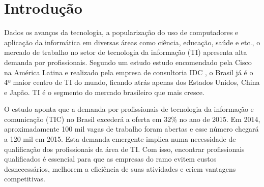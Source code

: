 
\begin{center}

\end{center}
\chapter{Introdução}

\label{chap:introduction}

Dados os avanços da tecnologia, a popularização do uso de computadores e aplicação da informática em diversas áreas como ciência, educação, saúde e etc., o mercado de trabalho no setor de tecnologia da informação (TI) apresenta alta demanda por profissionais. Segundo um estudo estudo encomendado pela Cisco na América Latina e realizado pela empresa de consultoria IDC \cite{cisco:13}, o Brasil já é o 4º maior centro de TI do mundo, ficando atrás apenas dos Estados Unidos, China e Japão. TI é o segmento do mercado brasileiro que mais cresce. 


O estudo aponta que a demanda por profissionais de tecnologia da informação e comunicação (TIC) no Brasil excederá a oferta em 32\% no ano de 2015. Em 2014, aproximadamente 100 mil vagas de trabalho foram abertas e esse número chegará a 120 mil em 2015. Esta demanda emergente implica numa necessidade de qualificação dos profissionais da área de TI. Com isso, encontrar profissionais qualificados é essencial para que as empresas do ramo evitem custos desnecessários, melhorem a eficiência de suas atividades e criem vantagens competitivas.

 

